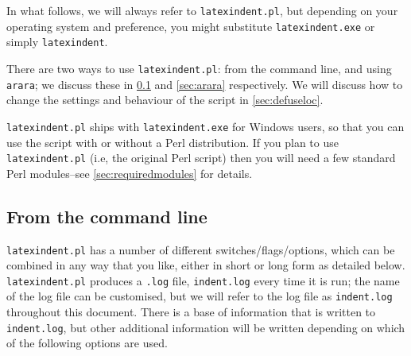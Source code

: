 \documentclass[8pt]{article}
\begin{document}
In what follows, we will always refer to \texttt{latexindent.pl}, but depending on
your operating system and preference, you might substitute \texttt{latexindent.exe} or
simply \texttt{latexindent}.

There are two ways to use \texttt{latexindent.pl}: from the command line,
and using \texttt{arara}; we discuss these in \cref{sec:commandline} and
\cref{sec:arara} respectively. We will discuss how to change the settings and 
behaviour of the script in \vref{sec:defuseloc}.

\texttt{latexindent.pl} ships with \texttt{latexindent.exe} for Windows
users, so that you can use the script with or without a Perl distribution.
If you plan to use \texttt{latexindent.pl} (i.e, the original Perl script) then you will
need a few standard Perl modules--see \vref{sec:requiredmodules} for details.

\subsection{From the command line}\label{sec:commandline}
\texttt{latexindent.pl} has a number of different switches/flags/options, which
can be combined in any way that you like, either in short or long form as detailed below. 
\texttt{latexindent.pl}  produces a \texttt{.log} file, \texttt{indent.log} every time it
is run; the name of the log file can be customised, but we will 
refer to the log file as \texttt{indent.log} throughout this document. 
There is a base of information that is written to \texttt{indent.log},
but other additional information will be written depending
on which of the following options are used.
\end{document}

